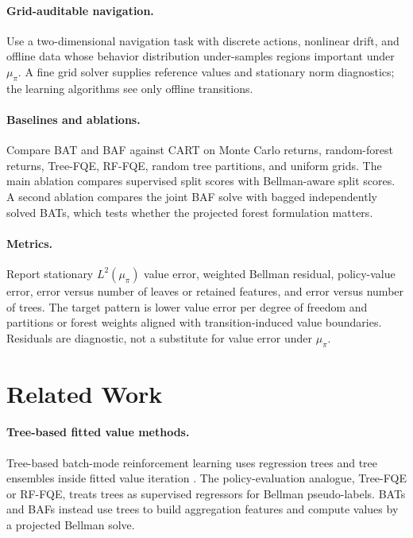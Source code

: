 \documentclass{article}
\theoremstyle{plain}
\theoremstyle{definition}
\theoremstyle{remark}
\begin{document}
\paragraph{Grid-auditable navigation.}
Use a two-dimensional navigation task with discrete actions, nonlinear drift,
and offline data whose behavior distribution under-samples regions important
under \(\mu_\pi\). A fine grid solver supplies reference values and stationary
norm diagnostics; the learning algorithms see only offline transitions.

\paragraph{Baselines and ablations.}
Compare BAT and BAF against CART on Monte Carlo returns, random-forest returns,
Tree-FQE, RF-FQE, random tree partitions, and uniform grids. The main ablation
compares supervised split scores with Bellman-aware split scores. A second
ablation compares the joint BAF solve with bagged independently solved BATs,
which tests whether the projected forest formulation matters.

\paragraph{Metrics.}
Report stationary \(L^2(\mu_\pi)\) value error, weighted Bellman residual,
policy-value error, error versus number of leaves or retained features, and
error versus number of trees. The target pattern is lower value error per
degree of freedom and partitions or forest weights aligned with
transition-induced value boundaries. Residuals are diagnostic, not a substitute
for value error under \(\mu_\pi\).

\section{Related Work}
\label{sec:related}

\paragraph{Tree-based fitted value methods.}
Tree-based batch-mode reinforcement learning uses regression trees and tree
ensembles inside fitted value iteration \citep{ernst2005tree}. The
policy-evaluation analogue, Tree-FQE or RF-FQE, treats trees as supervised
regressors for Bellman pseudo-labels. BATs and BAFs instead use trees to build
aggregation features and compute values by a projected Bellman solve.
\end{document}
